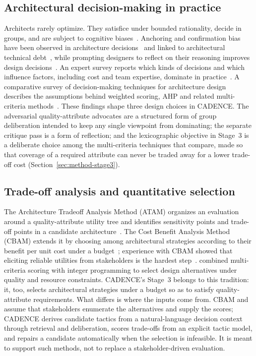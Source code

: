 \documentclass[preprint,12pt,authoryear]{elsarticle}
\renewcommand{\_}{\textunderscore\allowbreak{}}
\begin{document}
\subsection{Architectural decision-making in practice}

Architects rarely optimize. They satisfice under bounded rationality, decide in groups, and are subject to cognitive biases~\citep{vanvliet2016}. Anchoring and confirmation bias have been observed in architecture decisions~\citep{zalewski2017} and linked to architectural technical debt~\citep{borowa2021}, while prompting designers to reflect on their reasoning improves design decisions~\citep{razavian2016}. An expert survey reports which kinds of decisions and which influence factors, including cost and team expertise, dominate in practice~\citep{weinreich2015}. A comparative survey of decision-making techniques for architecture design describes the assumptions behind weighted scoring, AHP and related multi-criteria methods~\citep{falessi2011}. These findings shape three design choices in CADENCE. The adversarial quality-attribute advocates are a structured form of group deliberation intended to keep any single viewpoint from dominating; the separate critique pass is a form of reflection; and the lexicographic objective in Stage~3 is a deliberate choice among the multi-criteria techniques that \citet{falessi2011} compare, made so that coverage of a required attribute can never be traded away for a lower trade-off cost (Section~\ref{sec:method-stage3}).

\subsection{Trade-off analysis and quantitative selection}

The Architecture Tradeoff Analysis Method (ATAM) organizes an evaluation around a quality-attribute utility tree and identifies sensitivity points and trade-off points in a candidate architecture~\citep{kazman1998atam}. The Cost Benefit Analysis Method (CBAM) extends it by choosing among architectural strategies according to their benefit per unit cost under a budget~\citep{kazman2001cbam}; experience with CBAM showed that eliciting reliable utilities from stakeholders is the hardest step~\citep{moore2003}. \citet{alnaeem2005} combined multi-criteria scoring with integer programming to select design alternatives under quality and resource constraints. CADENCE's Stage~3 belongs to this tradition: it, too, selects architectural strategies under a budget so as to satisfy quality-attribute requirements. What differs is where the inputs come from. CBAM and \citet{alnaeem2005} assume that stakeholders enumerate the alternatives and supply the scores; CADENCE derives candidate tactics from a natural-language decision context through retrieval and deliberation, scores trade-offs from an explicit tactic model, and repairs a candidate automatically when the selection is infeasible. It is meant to support such methods, not to replace a stakeholder-driven evaluation.
\end{document}
